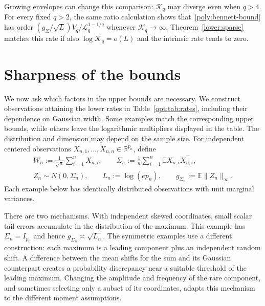 \documentclass[11pt,letterpaper,twoside,leqno]{article}
\theoremstyle{bookplain}
\theoremstyle{bookremark}
\newcommand{\E}{\mathbb E}
\newcommand{\R}{\mathbb R}
\begin{document}
Growing envelopes can change this comparison: $\mathcal K_q$ may
diverge even when $q>4$. For every fixed $q>2$, the same ratio
calculation shows that~\eqref{poly:bennett-bound} has order
$(g_\Sigma/\sqrt L)V_q/\mathcal L_q^{1-1/q}$ whenever
$\mathcal K_q\to\infty$.
Theorem~\ref{lower:sparse} matches this rate if also
$\log\mathcal K_q=o(L)$ and the intrinsic rate tends to zero.

\section{Sharpness of the bounds}\label{opt:section}

We now ask which factors in the upper bounds are necessary. We
construct observations attaining the lower rates in
Table~\ref{opt:tab:rates}, including their dependence on Gaussian
width. Some examples match the corresponding upper bounds, while
others leave the logarithmic multipliers displayed in the table.
The distribution and dimension may depend on the sample size.
For independent centered observations
$X_{n,1},\ldots,X_{n,n}\in\R^{p_n}$, define
\begin{equation}
\begin{gathered}
 W_n:=\frac1{\sqrt n}\sum_{i=1}^nX_{n,i},\qquad
 \Sigma_n:=\frac1n\sum_{i=1}^n\E X_{n,i}X_{n,i}^{\top},\\
 Z_n\sim N(0,\Sigma_n),\qquad
 L_n:=\log(ep_n),\qquad g_{\Sigma_n}:=\E\|Z_n\|_\infty.
\end{gathered}
\label{lower:eq:setup}
\end{equation}
Each example below has identically distributed observations with unit
marginal variances.

There are two mechanisms. With independent skewed coordinates,
small scalar tail errors accumulate in the distribution of the
maximum. This example has $\Sigma_n=I_{p_n}$ and hence
$g_{\Sigma_n}\asymp\sqrt{L_n}$.
The symmetric examples use a different construction: each maximum
is a leading component plus an independent random shift. A difference
between the mean shifts for the sum and its Gaussian counterpart
creates a probability discrepancy near a suitable threshold of the
leading maximum. Changing the amplitude and frequency of the rare
component, and sometimes selecting only a subset of its coordinates,
adapts this mechanism to the different moment assumptions.
\end{document}
